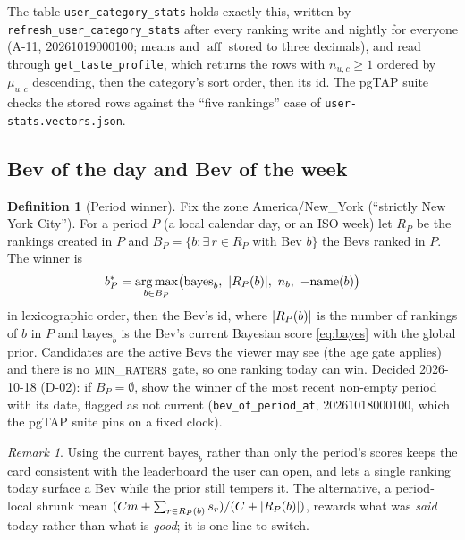 \documentclass[11pt]{article}
\DeclarePairedDelimiter\abs{\lvert}{\rvert}
\DeclareMathOperator*{\argmax}{arg\,max}
\DeclareMathOperator{\aff}{aff}
\newcommand{\code}[1]{\texttt{#1}}
\theoremstyle{plain}
\theoremstyle{definition}
\newtheorem{definition}[theorem]{Definition}
\theoremstyle{remark}
\newtheorem{remark}[theorem]{Remark}
\begin{document}
The table \code{user\_category\_stats} holds exactly this, written by \code{refresh\_user\_category\_stats} after every ranking write and nightly for everyone (A-11, 20261019000100; means and $\aff$ stored to three decimals), and read through \code{get\_taste\_profile}, which returns the rows with $n_{u,c} \ge 1$ ordered by $\mu_{u,c}$ descending, then the category's sort order, then its id. The pgTAP suite checks the stored rows against the ``five rankings'' case of \code{user-stats.vectors.json}.

\subsection{Bev of the day and Bev of the week}\label{sec:bevof}

\begin{definition}[Period winner]
Fix the zone America/New\_York (``strictly New York City''). For a period $P$ (a local calendar day, or an ISO week) let $R_P$ be the rankings created in $P$ and $B_P = \{ b : \exists\, r \in R_P \text{ with Bev } b \}$ the Bevs ranked in $P$. The winner is
\begin{equation}\label{eq:bevof}
b^\ast_P = \argmax_{b \in B_P} \bigl(\mathrm{bayes}_b,\ \abs{R_P(b)},\ n_b,\ -\mathrm{name}(b)\bigr)
\end{equation}
in lexicographic order, then the Bev's id, where $\abs{R_P(b)}$ is the number of rankings of $b$ in $P$ and $\mathrm{bayes}_b$ is the Bev's current Bayesian score \eqref{eq:bayes} with the global prior. Candidates are the active Bevs the viewer may see (the age gate applies) and there is no $\textsc{min\_raters}$ gate, so one ranking today can win. Decided 2026-10-18 (D-02): if $B_P = \emptyset$, show the winner of the most recent non-empty period with its date, flagged as not current (\code{bev\_of\_period\_at}, 20261018000100, which the pgTAP suite pins on a fixed clock).
\end{definition}

\begin{remark}
Using the current $\mathrm{bayes}_b$ rather than only the period's scores keeps the card consistent with the leaderboard the user can open, and lets a single ranking today surface a Bev while the prior still tempers it. The alternative, a period-local shrunk mean $(C m + \sum_{r \in R_P(b)} s_r)/(C + \abs{R_P(b)})$, rewards what was \emph{said} today rather than what is \emph{good}; it is one line to switch.
\end{remark}
\end{document}
